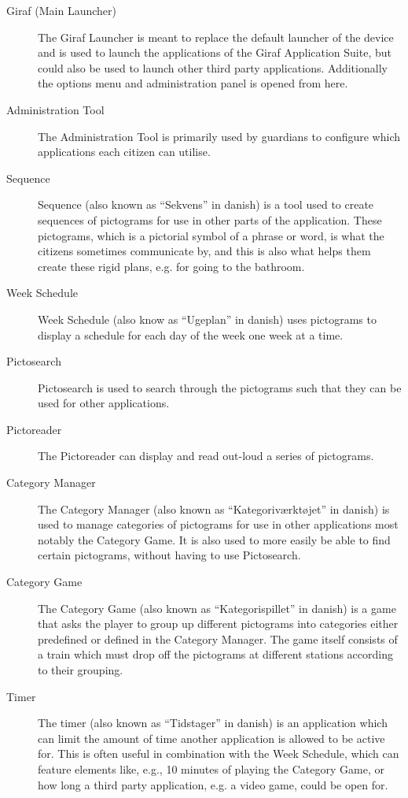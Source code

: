 \begin{description}
	\item[Giraf (Main Launcher)] The Giraf Launcher is meant to replace the default launcher of the device and is used to launch the applications of the Giraf Application Suite, but could also be used to launch other third party applications.
	Additionally the options menu and administration panel is opened from here. 
	\item[Administration Tool] The Administration Tool is primarily used by guardians to configure which applications each citizen can utilise. 
	\item[Sequence] Sequence (also known as ``Sekvens'' in danish) is a tool used to create sequences of pictograms for use in other parts of the application.
	These pictograms, which is a pictorial symbol of a phrase or word, is what the citizens sometimes communicate by, and this is also what helps them create these rigid plans, e.g. for going to the bathroom. 
	\item[Week Schedule] Week Schedule (also know as ``Ugeplan'' in danish) uses pictograms to display a schedule for each day of the week one week at a time. 
	\item[Pictosearch] Pictosearch is used to search through the pictograms such that they can be used for other applications. 
	\item[Pictoreader] The Pictoreader can display and read out-loud a series of pictograms. 
	\item[Category Manager] The Category Manager (also known as ``Kategoriværktøjet'' in danish) is used to manage categories of pictograms for use in other applications most notably the Category Game.
	It is also used to more easily be able to find certain pictograms, without having to use Pictosearch.
	\item[Category Game] The Category Game (also known as ``Kategorispillet'' in danish) is a game that asks the player to group up different pictograms into categories either predefined or defined in the Category Manager. 
	The game itself consists of a train which must drop off the pictograms at different stations according to their grouping.
	\item[Timer] The timer (also known as ``Tidstager'' in danish) is an application which can limit the amount of time another application is allowed to be active for. 
	This is often useful in combination with the Week Schedule, which can feature elements like, e.g., 10 minutes of playing the Category Game, or how long a third party application, e.g. a video game, could be open for.

\end{description}
